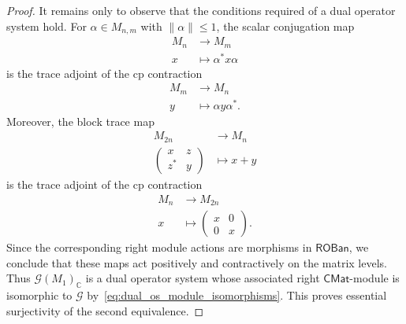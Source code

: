 \documentclass[11pt,onecolumn]{article}
\newcommand{\C}{\mathbb{C}}
\newcommand{\ROBan}{\mathsf{ROBan}}
\theoremstyle{plain}
\theoremstyle{remark}
\theoremstyle{definition}
\begin{document}
\begin{proof}
	It remains only to observe that the conditions required of a dual operator system hold.
	For $\alpha \in M_{n,m}$ with $\|\alpha\| \le 1$, the scalar conjugation map
	\begin{align*}
		M_n & \longrightarrow M_m \\
		x & \longmapsto \alpha^*x\alpha
	\end{align*}
	is the trace adjoint of the cp contraction
	\begin{align*}
		M_m & \longrightarrow M_n \\
		y & \longmapsto \alpha y\alpha^*.
	\end{align*}
	Moreover, the block trace map
	\begin{align*}
		M_{2n} & \longrightarrow M_n \\
		\begin{pmatrix}
			x & z \\
			z^* & y
		\end{pmatrix}
		& \longmapsto x+y
	\end{align*}
	is the trace adjoint of the cp contraction
	\begin{align*}
		M_n & \longrightarrow M_{2n} \\
		x & \longmapsto \begin{pmatrix}
			x & 0 \\
			0 & x
		\end{pmatrix}.
	\end{align*}
	Since the corresponding right module actions are morphisms in $\ROBan$, we conclude that these maps act positively and contractively on the matrix levels.
	Thus $\mathcal{G}(M_1)_\C$ is a dual operator system whose associated right $\mathsf{CMat}$-module is isomorphic to $\mathcal{G}$ by~\eqref{eq:dual_os_module_isomorphisms}.
	This proves essential surjectivity of the second equivalence.
\end{proof}
\end{document}
